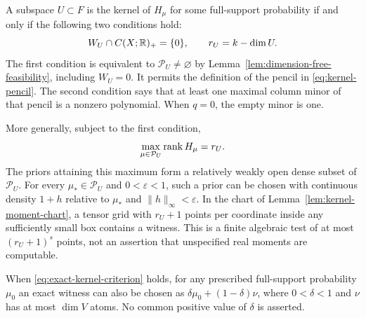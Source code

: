\begin{theorem}
\label{thm:exact-kernel}
A subspace $U\subset F$ is the kernel of $H_\mu$ for some full-support
probability if and only if the following two conditions hold:
\begin{equation}\label{eq:exact-kernel-criterion}
 W_U\cap C(X;\mathbb R)_+=\{0\},\qquad r_U=k-\dim U.
\end{equation}
The first condition is equivalent to $\mathcal P_U\ne\varnothing$
by Lemma~\ref{lem:dimension-free-feasibility}, including $W_U=0$.
It permits the definition of the pencil in \eqref{eq:kernel-pencil}. The second condition says that at
least one maximal column minor of that pencil is a nonzero polynomial.
When $q=0$, the empty minor is one.

More generally, subject to the first condition,
\begin{equation}\label{eq:kernel-slice-max-rank}
 \max_{\mu\in\mathcal P_U}\operatorname{rank} H_\mu=r_U.
\end{equation}
The priors attaining this maximum form a relatively weakly open dense
subset of $\mathcal P_U$. For every $\mu_*\in\mathcal P_U$ and
$0<\varepsilon<1$, such a prior can be chosen with continuous density
$1+h$ relative to $\mu_*$ and $\|h\|_\infty<\varepsilon$.
In the chart of Lemma~\ref{lem:kernel-moment-chart}, a tensor grid with
$r_U+1$ points per coordinate inside any sufficiently small box contains
a witness. This is a finite algebraic test of at most $(r_U+1)^s$
points, not an assertion that unspecified real moments are computable.

When \eqref{eq:exact-kernel-criterion} holds, for any prescribed
full-support probability $\mu_0$ an exact witness can also be chosen as
$\delta\mu_0+(1-\delta)\nu$, where $0<\delta<1$ and $\nu$ has at
most $\dim V$ atoms. No common positive value of $\delta$ is asserted.
\end{theorem}
